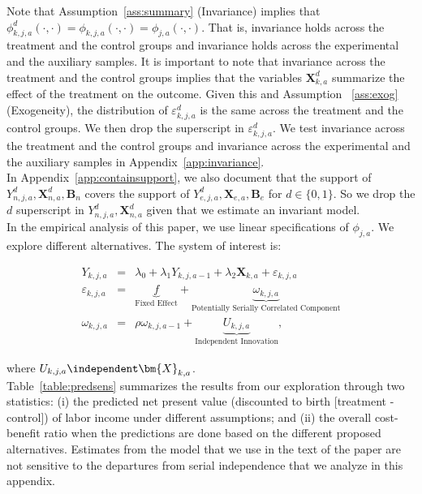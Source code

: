 \noindent Note that Assumption~\ref{ass:summary} (Invariance) implies that $\phi_{k,j,a}^d \left (\cdot, \cdot \right) = \phi_{k,j,a}  \left (\cdot, \cdot \right) = \phi_{j,a}  \left (\cdot, \cdot \right)$. That is, invariance holds across the treatment and the control groups and invariance holds across the experimental and the auxiliary samples. It is important to note that invariance across the treatment and the control groups implies that the variables $\bm{X}_{k,a}^d$ summarize the effect of the treatment on the outcome. Given this and Assumption ~\ref{ass:exog} (Exogeneity), the distribution of $\varepsilon_{k,j,a}^d$ is the same across the treatment and the control groups. We then drop the superscript in $\varepsilon_{k,j,a}^d$. We test invariance across the treatment and the control groups and invariance across the experimental and the auxiliary samples  in Appendix~\ref{app:invariance}.\\

\noindent In Appendix~\ref{app:containsupport}, we also document that the support of $Y_{n,j,a}^d, \bm{X}_{n,a}^d, \bm{B}_{n}$ covers the support of $Y_{e,j,a}^d, \bm{X}_{e,a}, \bm{B}_{e}$ for $d \in \{0, 1\}$. So we drop the $d$ superscript in $Y_{n,j,a}^d, \bm{X}_{n,a}^d$ given that we estimate an invariant model.\\

\noindent In the empirical analysis of this paper, we use linear specifications of $\phi_{j,a}$. We explore different alternatives. The system of interest is:

\begin{eqnarray}
Y_{k,j,a}                   &=& \lambda_{0} + \lambda_{1} Y_{k,j,a-1} + \lambda_{2}  \bm{X}_{k,a} + \varepsilon_{k,j,a} \nonumber \\
\varepsilon_{k,j,a} &=& \underbrace{f}_{\text{Fixed Effect}} + \underbrace{\omega_{k,j,a}}_{\text{Potentially Serially Correlated Component}} \nonumber \\
\omega_{k,j,a}      &=& \rho \omega_{k,j,a-1} + \underbrace{U_{k,j,a}}_{\text{Independent Innovation}},
\end{eqnarray}

\noindent where $U_{k,j,a} \independent \bm{X}_{k,a}$.\\

\noindent Table~\ref{table:predsens} summarizes the results from our exploration through two statistics: (i) the predicted net present value (discounted to birth [treatment - control]) of labor income under different assumptions; and (ii) the overall cost-benefit ratio when the predictions are done based on the different proposed alternatives. Estimates from the model that we use in the text of the paper are not sensitive to the departures from serial independence that we analyze in this appendix.\\

